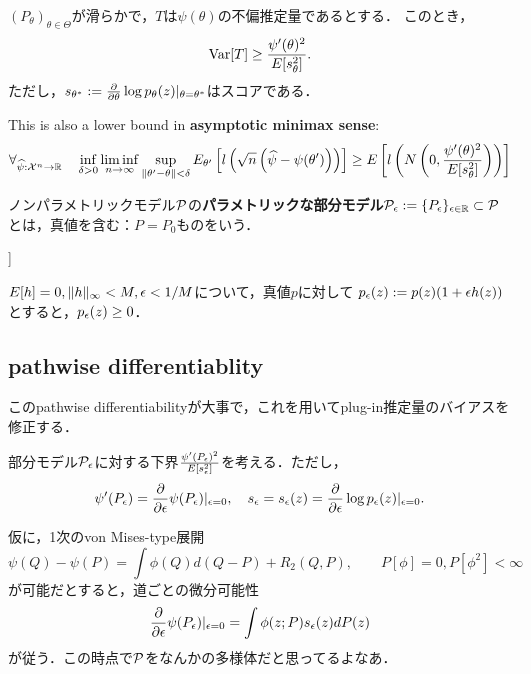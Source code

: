 \documentclass[uplatex,dvipdfmx]{jsreport}
\begin{document}
\begin{discussion}
    $(P_\theta)_{\theta\in\Theta}$が滑らかで，$T$は$\psi(\theta)$の不偏推定量であるとする．
    このとき，
    \[\Var[T]\ge\frac{\psi'(\theta)^2}{E[s^2_\theta]}.\]
    ただし，$s_{\theta^*}:=\pp{}{\theta}\log p_\theta(z)|_{\theta=\theta^*}$はスコアである．

    This is also a lower bound in \textbf{asymptotic minimax sense}:
    \[\forall_{\wh{\psi}:\X^n\to\R}\quad\inf_{\delta>0}\liminf_{n\to\infty}\sup_{\norm{\theta'-\theta}<\delta}E_{\theta'}\Square{l\paren{\sqrt{n}\paren{\wh{\psi}-\psi(\theta')}}}\ge E\Square{l\paren{N\paren{0,\frac{\psi'(\theta)^2}{E[s^2_\theta]}}}}\]
\end{discussion}

\begin{definition}
    ノンパラメトリックモデル$\P$の\textbf{パラメトリックな部分モデル}$\P_\ep:=\{P_\ep\}_{\ep\in\R}\subset\P$とは，真値を含む：$P=P_0$ものをいう．
\end{definition}]
\begin{example}
    $E[h]=0,\norm{h}_\infty<M,\ep<1/M$について，真値$p$に対して
    $p_\ep(z):=p(z)(1+\ep h(z))$とすると，$p_\ep(z)\ge0$．
\end{example}

\subsection{pathwise differentiablity}

\begin{tcolorbox}[colframe=ForestGreen, colback=ForestGreen!10!white,breakable,colbacktitle=ForestGreen!40!white,coltitle=black,fonttitle=\bfseries\sffamily,
title=]
    このpathwise differentiabilityが大事で，これを用いてplug-in推定量のバイアスを修正する．
\end{tcolorbox}

\begin{problem}
    部分モデル$\P_\ep$に対する下界$\frac{\psi'(P_\ep)^2}{E[s^2_\ep]}$を考える．ただし，
    \[\psi'(P_\ep)=\pp{}{\ep}\psi(P_\ep)|_{\ep=0},\quad s_\ep=s_\ep(z)=\pp{}{\ep}\log p_\ep(z)|_{\ep=0}.\]
\end{problem}

\begin{discussion}
    仮に，1次のvon Mises-type展開
    \[\psi(Q)-\psi(P)=\int\phi(Q)d(Q-P)+R_2(Q,P),\qquad P[\phi]=0,P[\phi^2]<\infty\]
    が可能だとすると，道ごとの微分可能性
    \[\pp{}{\ep}\psi(P_\ep)|_{\ep=0}=\int\phi(z;P)s_\ep(z)dP(z)\]
    が従う．この時点で$\P$をなんかの多様体だと思ってるよなあ．
\end{discussion}
\end{document}
